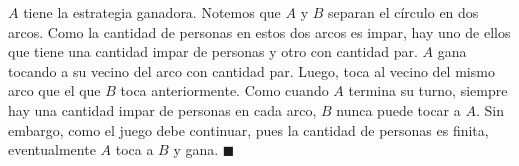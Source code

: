 $A$ tiene la estrategia ganadora. Notemos que $A$ y $B$ separan el círculo en dos arcos. Como la cantidad de personas en estos dos arcos es impar, hay uno de ellos que tiene una cantidad impar de personas y otro con cantidad par. $A$ gana tocando a su vecino del arco con cantidad par. Luego, toca al vecino del mismo arco que el que $B$ toca anteriormente. Como cuando $A$ termina su turno, siempre hay una cantidad impar de personas en cada arco, $B$ nunca puede tocar a $A$. Sin embargo, como el juego debe continuar, pues la cantidad de personas es finita, eventualmente $A$ toca a $B$ y gana. $\blacksquare$
